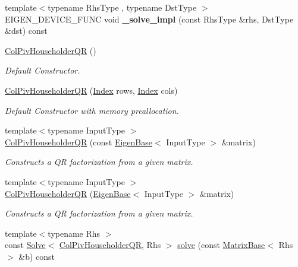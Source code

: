 \begin{DoxyCompactItemize}
\mbox{\label{group___q_r___module_a22731a654f7568409c6a0d5592a192ba}} 
{\footnotesize template$<$typename Rhs\+Type , typename Dst\+Type $>$ }\\E\+I\+G\+E\+N\+\_\+\+D\+E\+V\+I\+C\+E\+\_\+\+F\+U\+NC void {\bfseries \+\_\+solve\+\_\+impl} (const Rhs\+Type \&rhs, Dst\+Type \&dst) const
\item 
\hyperlink{group___q_r___module_a9d8a92c2a2f0debe5454812372237ed4}{Col\+Piv\+Householder\+QR} ()
\begin{DoxyCompactList}\small\item\em Default Constructor. \end{DoxyCompactList}\item 
\hyperlink{group___q_r___module_a5965d4fdebc04b2df71d67ff0b2d0c2c}{Col\+Piv\+Householder\+QR} (\hyperlink{namespace_eigen_a62e77e0933482dafde8fe197d9a2cfde}{Index} rows, \hyperlink{namespace_eigen_a62e77e0933482dafde8fe197d9a2cfde}{Index} cols)
\begin{DoxyCompactList}\small\item\em Default Constructor with memory preallocation. \end{DoxyCompactList}\item 
{\footnotesize template$<$typename Input\+Type $>$ }\\\hyperlink{group___q_r___module_a1aa6a5b95380df0ceb224cb833316d4f}{Col\+Piv\+Householder\+QR} (const \hyperlink{group___core___module_struct_eigen_1_1_eigen_base}{Eigen\+Base}$<$ Input\+Type $>$ \&matrix)
\begin{DoxyCompactList}\small\item\em Constructs a QR factorization from a given matrix. \end{DoxyCompactList}\item 
{\footnotesize template$<$typename Input\+Type $>$ }\\\hyperlink{group___q_r___module_a65782010a93a4c9ef4a9191ac8fe30bc}{Col\+Piv\+Householder\+QR} (\hyperlink{group___core___module_struct_eigen_1_1_eigen_base}{Eigen\+Base}$<$ Input\+Type $>$ \&matrix)
\begin{DoxyCompactList}\small\item\em Constructs a QR factorization from a given matrix. \end{DoxyCompactList}\item 
{\footnotesize template$<$typename Rhs $>$ }\\const \hyperlink{group___core___module_class_eigen_1_1_solve}{Solve}$<$ \hyperlink{group___q_r___module_class_eigen_1_1_col_piv_householder_q_r}{Col\+Piv\+Householder\+QR}, Rhs $>$ \hyperlink{group___q_r___module_aaa9c4af89930ab3bb7612ed9ae33d3f5}{solve} (const \hyperlink{group___core___module_class_eigen_1_1_matrix_base}{Matrix\+Base}$<$ Rhs $>$ \&b) const

\end{DoxyCompactItemize}
